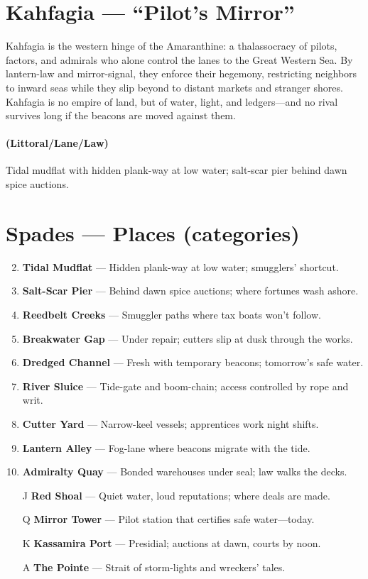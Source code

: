\section{Kahfagia --- ``Pilot's Mirror''}
\label{chap:kahfagia}

\begin{tcolorbox}[colback=black!3,colframe=black!40!white,title={Theme \& Atmosphere}]
Kahfagia is the western hinge of the Amaranthine: a thalassocracy of pilots, factors, and admirals who alone control the lanes to the Great Western Sea. By lantern-law and mirror-signal, they enforce their hegemony, restricting neighbors to inward seas while they slip beyond to distant markets and stranger shores. Kahfagia is no empire of land, but of water, light, and ledgers---and no rival survives long if the beacons are moved against them.
\end{tcolorbox}

\paragraph*{(Littoral/Lane/Law)} Tidal mudflat with hidden plank-way at low water; salt-scar pier behind dawn spice auctions.

\section*{Spades --- Places (categories)}
\label{sec:kahfagia-places}
\begin{enumerate}
\setcounter{enumi}{1}
\item \textbf{Tidal Mudflat} --- Hidden plank-way at low water; smugglers' shortcut.
\item \textbf{Salt-Scar Pier} --- Behind dawn spice auctions; where fortunes wash ashore.
\item \textbf{Reedbelt Creeks} --- Smuggler paths where tax boats won't follow.
\item \textbf{Breakwater Gap} --- Under repair; cutters slip at dusk through the works.
\item \textbf{Dredged Channel} --- Fresh with temporary beacons; tomorrow's safe water.
\item \textbf{River Sluice} --- Tide-gate and boom-chain; access controlled by rope and writ.
\item \textbf{Cutter Yard} --- Narrow-keel vessels; apprentices work night shifts.
\item \textbf{Lantern Alley} --- Fog-lane where beacons migrate with the tide.
\item \textbf{Admiralty Quay} --- Bonded warehouses under seal; law walks the decks.
\item[J] \textbf{Red Shoal} --- Quiet water, loud reputations; where deals are made.
\item[Q] \textbf{Mirror Tower} --- Pilot station that certifies safe water---today.
\item[K] \textbf{Kassamira Port} --- Presidial; auctions at dawn, courts by noon.
\item[A] \textbf{The Pointe} --- Strait of storm-lights and wreckers' tales.
\end{enumerate}

